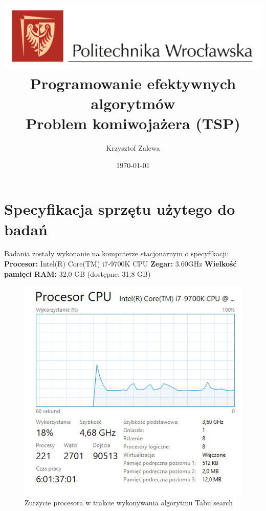 \documentclass{article}
\title{
  \centering
  \includegraphics[width=\textwidth]{src/images/logo_PWr_kolor_poziom.png}\\
  \fontsize{28pt}{30pt}\selectfont Programowanie efektywnych algorytmów\\
  \fontsize{14pt}{30pt}\selectfont Problem komiwojażera (TSP)}
\author{Krzysztof Zalewa}
\date{\daymonthyear\today}
\begin{document}
    \maketitle
    \pagebreak
    \tableofcontents
    \FloatBarrier
    \raggedright
    \section{Specyfikacja sprzętu użytego do badań}
      Badania zostały wykonanie na komputerze stacjonarnym o specyfikacji: \linebreak
      \textbf{Procesor:} Intel(R) Core(TM) i7-9700K CPU \linebreak
      \textbf{Zegar:} 3.60GHz \linebreak
      \textbf{Wielkość pamięci RAM:} 32,0 GB (dostępne: 31,8 GB) \linebreak
      \begin{figure}[ht]
        \centering
        \includegraphics[width=\textwidth]{src/images/Zurzycie_procesora_Tabu.png}
        \caption{Zurzycie procesora w trakcie wykonywania algorytmu Tabu search}
        \label{fig:procTabu}
      \end{figure}
      \FloatBarrier
\end{document}
